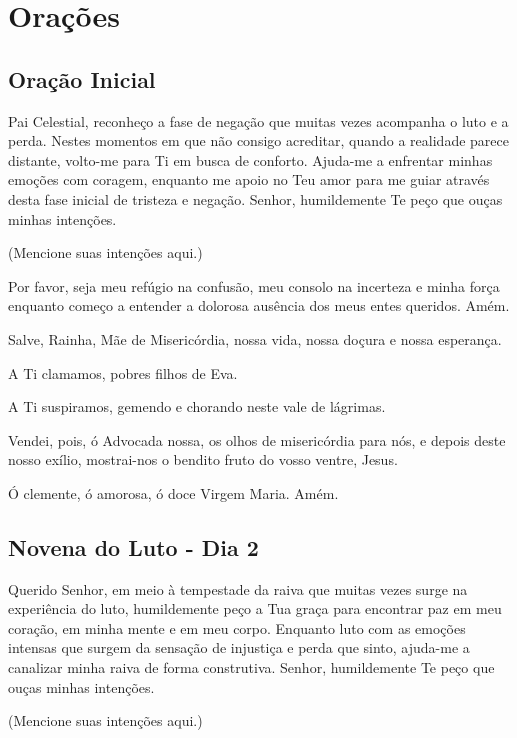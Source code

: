 \documentclass[18pt]{article}
\begin{document}

\newpage
\section{Orações}\label{sec:Orações} %
\subsection{Oração Inicial}\label{sec:Oração_Inicial} %

Pai Celestial, reconheço a fase de negação que muitas vezes acompanha o luto e a perda. Nestes momentos em que não consigo acreditar, quando a realidade parece distante, volto-me para Ti em busca de conforto. Ajuda-me a enfrentar minhas emoções com coragem, enquanto me apoio no Teu amor para me guiar através desta fase inicial de tristeza e negação. Senhor, humildemente Te peço que ouças minhas intenções.

(Mencione suas intenções aqui.)

Por favor, seja meu refúgio na confusão, meu consolo na incerteza e minha força enquanto começo a entender a dolorosa ausência dos meus entes queridos. Amém.

Salve, Rainha, Mãe de Misericórdia, nossa vida, nossa doçura e nossa esperança.

A Ti clamamos, pobres filhos de Eva.

A Ti suspiramos, gemendo e chorando neste vale de lágrimas.

Vendei, pois, ó Advocada nossa, os olhos de misericórdia para nós, e depois deste nosso exílio, mostrai-nos o bendito fruto do vosso ventre, Jesus.

Ó clemente, ó amorosa, ó doce Virgem Maria. Amém.

\subsection{Novena do Luto - Dia 2}
Querido Senhor, em meio à tempestade da raiva que muitas vezes surge na experiência do luto, humildemente peço a Tua graça para encontrar paz em meu coração, em minha mente e em meu corpo. Enquanto luto com as emoções intensas que surgem da sensação de injustiça e perda que sinto, ajuda-me a canalizar minha raiva de forma construtiva. Senhor, humildemente Te peço que ouças minhas intenções.

(Mencione suas intenções aqui.)
\end{document}
